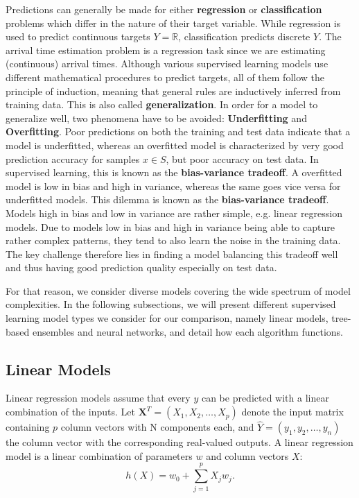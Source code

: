 Predictions can generally be made for either \textbf{regression} or \textbf{classification} problems which differ in the nature of their target variable. 
While regression is used to predict continuous targets $ Y = \mathbb{R} $, classification predicts discrete $ Y $. The arrival time estimation problem is a regression task since we are estimating (continuous) arrival times.
Although various supervised learning models use different mathematical procedures to predict targets, all of them follow the principle of induction, meaning that general rules are inductively inferred from training data. This is also called \textbf{generalization}.  
In order for a model to generalize well, two phenomena have to be avoided: \textbf{Underfitting} and \textbf{Overfitting}. 
Poor predictions on both the training and test data indicate that a model is underfitted, whereas an overfitted model is characterized by very good prediction accuracy for samples $ x \in S $, but poor accuracy on test data.
In supervised learning, this is known as the \textbf{bias-variance tradeoff}. 
A overfitted model is low in bias and high in variance, whereas the same goes vice versa for underfitted models. This dilemma is known as the \textbf{bias-variance tradeoff}. Models high in bias and low in variance are rather simple, e.g. linear regression models. Due to models low in bias and high in variance being able to capture rather complex patterns, they tend to also learn the noise in the training data. 
The key challenge therefore lies in finding a model balancing this tradeoff well and thus having good prediction quality especially on test data. 

For that reason, we consider diverse models covering the wide spectrum of model complexities. In the following subsections, we will present different supervised learning model types we consider for our comparison, namely linear models, tree-based ensembles and neural networks, and detail how each algorithm functions.
 
\subsection{Linear Models}

Linear regression models assume that every $ y $ can be predicted with a linear combination of the inputs. 
Let $ \textbf{X}^{T} = (X_1, X_2, \dots, X_p) $ denote the input matrix containing $ p $ column vectors with N components each, and $ \hat{Y} = (y_1, y_2, \dots, y_n)$ the column vector with the corresponding real-valued outputs. A linear regression model is a linear combination of parameters $ w $ and column vectors $ X $:
\begin{equation}
h(X) = w_0 + \sum_{j=1}^{p} X_jw_j.
\end{equation}

